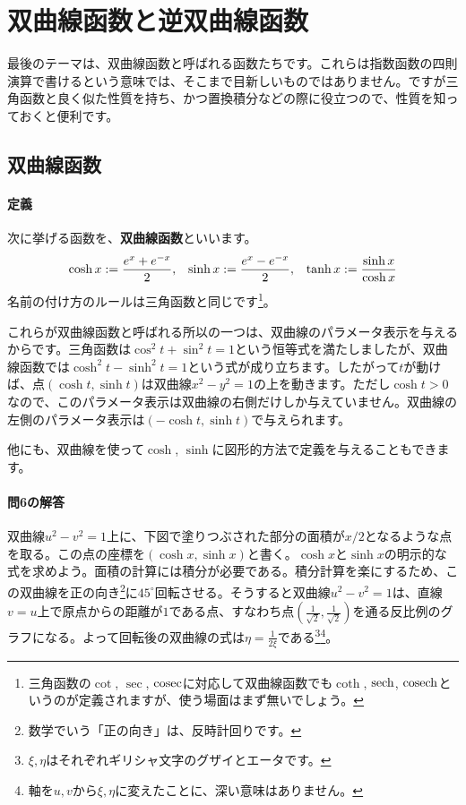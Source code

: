 \section{双曲線函数と逆双曲線函数}

最後のテーマは、双曲線函数と呼ばれる函数たちです。これらは指数函数の四則演算で書けるという意味では、そこまで目新しいものではありません。ですが三角函数と良く似た性質を持ち、かつ置換積分などの際に役立つので、性質を知っておくと便利です。

\subsection{双曲線函数}

\paragraph{定義}
次に挙げる函数を、\textbf{双曲線函数}といいます。
\begin{align*}
\cosh x &:= \frac{e^x+e^{-x}}{2}\index{cosh}, & \sinh x &:= \frac{e^x - e^{-x}}{2}\index{sinh}, & \tanh x := \frac{\sinh x}{\cosh x}\index{tanh}
\end{align*}
名前の付け方のルールは三角函数と同じです\footnote{三角函数の$\cot$, $\sec$, $\operatorname{cosec}$に対応して双曲線函数でも$\coth$, $\operatorname{sech}$, $\operatorname{cosech}$というのが定義されますが、使う場面はまず無いでしょう。}。

これらが双曲線函数と呼ばれる所以の一つは、双曲線のパラメータ表示を与えるからです。三角函数は$\cos^2 t + \sin^2 t =1$という恒等式を満たしましたが、双曲線函数では$\cosh^2 t - \sinh^2 t = 1$という式が成り立ちます。したがって$t$が動けば、点$(\cosh t,\sinh t)$は双曲線$x^2-y^2=1$の上を動きます。ただし$\cosh t>0$なので、このパラメータ表示は双曲線の右側だけしか与えていません。双曲線の左側のパラメータ表示は$(-\cosh t,\sinh t)$で与えられます。

他にも、双曲線を使って$\cosh$, $\sinh$に図形的方法で定義を与えることもできます。

\paragraph{問6の解答}
双曲線$u^2-v^2=1$上に、下図で塗りつぶされた部分の面積が$x/2$となるような点を取る。この点の座標を$(\cosh x, \sinh x)$と書く。$\cosh x$と$\sinh x$の明示的な式を求めよう。面積の計算には積分が必要である。積分計算を楽にするため、この双曲線を正の向き\footnote{数学でいう「正の向き」は、反時計回りです。}に$45^{\circ}$回転させる。そうすると双曲線$u^2-v^2=1$は、直線$v=u$上で原点からの距離が$1$である点、すなわち点$(\frac{1}{\sqrt{2}},\frac{1}{\sqrt{2}})$を通る反比例のグラフになる。よって回転後の双曲線の式は$\eta=\frac{1}{2\xi}$である\footnote{$\xi,\eta$はそれぞれギリシャ文字のグザイとエータです。}\footnote{軸を$u,v$から$\xi,\eta$に変えたことに、深い意味はありません。}。

